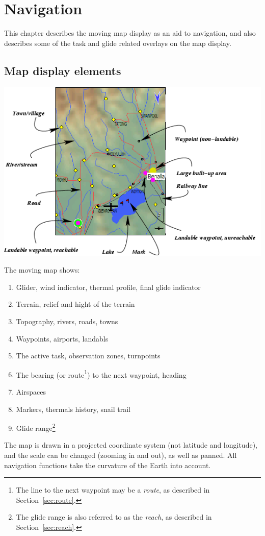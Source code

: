 \chapter{Navigation}\label{cha:navigation}
This chapter describes the moving map display as an aid to navigation,
and also describes some of the task and glide related overlays on the
map display.

\section{Map display elements}

\begin{maxipage}
\includegraphics[angle=0,width=0.9\linewidth,keepaspectratio='true']{figures/fig-map.png}
\end{maxipage}

The moving map shows:
\begin{enumerate} 
\item Glider, wind indicator, thermal profile, final glide indicator
\item Terrain, relief and hight of the terrain
\item Topography, rivers, roads, towns
\item Waypoints, airports, landabls 
\item The active task, observation zones, turnpoints
\item The bearing (or route\footnote{The line to the next waypoint may be a 
  {\em route}, as described in Section~\ref{sec:route}.}) to the next waypoint, 
  heading
\item Airspaces
\item Markers, thermals history, snail trail
\item Glide range\footnote{The glide range is also referred to as the 
  {\em reach}, as described in Section~\ref{sec:reach}.}
\end{enumerate}
The map is drawn in a projected coordinate system (not latitude and
longitude), and the scale can be changed (zooming in and out), as well
as panned.  All navigation functions take the curvature of the Earth
into account.

